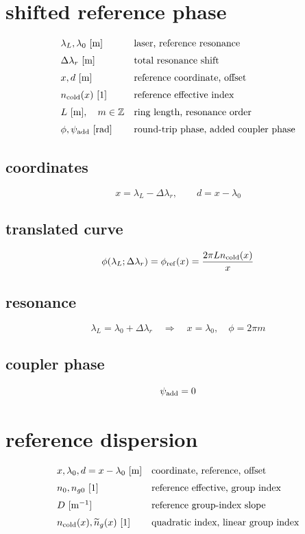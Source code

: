 \documentclass[11pt]{article}
\begin{document}
\section*{shifted reference phase}
\[
\begin{array}{ll}\lambda_L,\lambda_0\ [\mathrm m]&\text{laser, reference resonance}\\[0.6em]\Delta\lambda_r\ [\mathrm m]&\text{total resonance shift}\\[0.6em]x,d\ [\mathrm m]&\text{reference coordinate, offset}\\[0.6em]n_{\rm cold}(x)\ [1]&\text{reference effective index}\\[0.6em]L\ [\mathrm m],\quad m\in\mathbb Z&\text{ring length, resonance order}\\[0.6em]\phi,\psi_{\rm add}\ [\mathrm{rad}]&\text{round-trip phase, added coupler phase}\end{array}
\]
\subsection*{coordinates}
\[
\displaystyle x=\lambda_L-\Delta\lambda_r,\qquad d=x-\lambda_0
\]
\subsection*{translated curve}
\[
\displaystyle \phi(\lambda_L;\Delta\lambda_r)=\phi_{\rm ref}(x)=\frac{2\pi L n_{\rm cold}(x)}{x}
\]
\subsection*{resonance}
\[
\displaystyle \lambda_L=\lambda_0+\Delta\lambda_r\quad\Longrightarrow\quad x=\lambda_0,\quad\phi=2\pi m
\]
\subsection*{coupler phase}
\[
\displaystyle \psi_{\rm add}=0
\]

\clearpage
\section*{reference dispersion}
\[
\begin{array}{ll}x,\lambda_0,d=x-\lambda_0\ [\mathrm m]&\text{coordinate, reference, offset}\\[0.6em]n_0,n_{g0}\ [1]&\text{reference effective, group index}\\[0.6em]D\ [\mathrm{m^{-1}}]&\text{reference group-index slope}\\[0.6em]n_{\rm cold}(x),\widetilde n_g(x)\ [1]&\text{quadratic index, linear group index}\end{array}
\]
\end{document}
